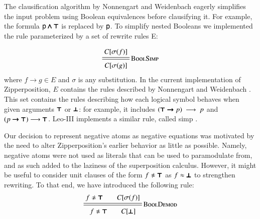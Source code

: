 The clausification algorithm by Nonnengart and Weidenbach \cite{nw-01-small-cnf}
eagerly simplifies the input problem using Boolean equivalences before clausifying it. For example,
the formula $\mathsf{p}\pmb{\land}\pmb{\top}$ is replaced by $\mathsf{p}$. To simplify nested Booleans we implemented the rule 
parameterized by a set of rewrite rules E:

\[
\namedsimp{BoolSimp}{C[\sigmaterm{f}]}{C[\sigmaterm{g}]}
\]
where $f \longrightarrow g \in E$ and $\sigma$ is any substitution. In the current implementation of Zipperposition, $E$ contains the rules
described by Nonnengart and Weidenbach \cite[Sect.~3]{nw-01-small-cnf}. This set contains
the rules describing how each logical symbol behaves when given arguments $\pmb{\top}$ or $\pmb{\bot}$: for example, 
it includes $(\pmb{\top} \pmb{\rightarrow} p)~\longrightarrow~p $ and $(p \pmb{\rightarrow} \pmb{\top}) \longrightarrow \pmb{\top}$. %
Leo-III implements a similar rule, called \textsf{simp} \cite[Sect.~4.2.1.]{as-18-phd}.


Our decision to represent negative atoms as negative equations was motivated by
the need to alter Zipperposition's earlier behavior as little as possible. 
Namely, negative atoms were not used as literals that can be used
to paramodulate from, and as such added to the laziness of the superposition calculus.
However, it might be useful to consider unit clauses of the form $f \noteq \itrue$
as $f \approx \pmb{\bot}$ to strengthen rewriting. To that end, we have introduced the following
rule:
%
$$ \namedsimp{BoolDemod}{f \noteq \itrue \qquad C[\sigmaterm{f}]}{f \noteq \itrue \qquad C[\ifalse]} $$

